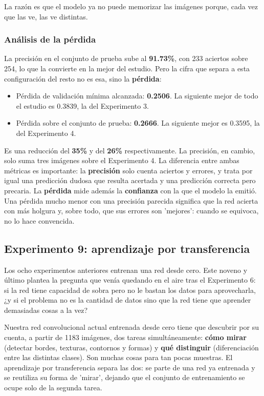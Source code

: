 \documentclass[11pt, a4paper]{article}
\begin{document}
La razón es que el modelo ya no puede memorizar las imágenes porque, cada vez que las ve, las ve distintas.

\subsubsection{Análisis de la pérdida}

La precisión en el conjunto de prueba sube al \textbf{91.73\%}, con 233 aciertos sobre 254, lo que la convierte en la mejor del estudio. Pero la cifra que separa a esta configuración del resto no es esa, sino la \textbf{pérdida}:

\begin{itemize}
    \item Pérdida de validación mínima alcanzada: \textbf{0.2506}. La siguiente mejor de todo el estudio es 0.3839, la del Experimento 3.
    \item Pérdida sobre el conjunto de prueba: \textbf{0.2666}. La siguiente mejor es 0.3595, la del Experimento 4.
\end{itemize}

Es una reducción del \textbf{35\%} y del \textbf{26\%} respectivamente. La precisión, en cambio, solo suma tres imágenes sobre el Experimento 4. La diferencia entre ambas métricas es importante: la \textbf{precisión} solo cuenta aciertos y errores, y trata por igual una predicción dudosa que resulta acertada y una predicción correcta pero precaria. La \textbf{pérdida} mide además la \textbf{confianza} con la que el modelo la emitió. Una pérdida mucho menor con una precisión parecida significa que la red acierta con más holgura y, sobre todo, que sus errores son 'mejores': cuando se equivoca, no lo hace convencida.

\subsection{Experimento 9: aprendizaje por transferencia}

Los ocho experimentos anteriores entrenan una red desde cero. Este noveno y último plantea la pregunta que venía quedando en el aire tras el Experimento 6: si la red tiene capacidad de sobra pero no le bastan los datos para aprovecharla, ¿y si el problema no es la cantidad de datos sino que la red tiene que aprender demasiadas cosas a la vez?

Nuestra red convolucional actual entrenada desde cero tiene que descubrir por su cuenta, a partir de 1183 imágenes, dos tareas simultáneamente: \textbf{cómo mirar} (detectar bordes, texturas, contornos y formas) y \textbf{qué distinguir} (diferenciación entre las distintas clases). Son muchas cosas para tan pocas muestras. El aprendizaje por transferencia separa las dos: se parte de una red ya entrenada y se reutiliza su forma de 'mirar', dejando que el conjunto de entrenamiento se ocupe solo de la segunda tarea.
\end{document}

